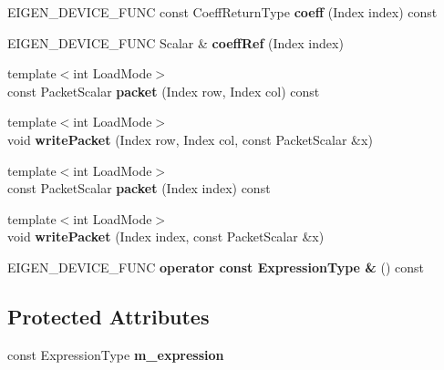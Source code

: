 \begin{DoxyCompactItemize}
E\+I\+G\+E\+N\+\_\+\+D\+E\+V\+I\+C\+E\+\_\+\+F\+U\+NC const Coeff\+Return\+Type {\bfseries coeff} (Index index) const
\item 
\mbox{\label{class_eigen_1_1_nest_by_value_a18a3445c5f65d1d786b7f034228c5281}} 
E\+I\+G\+E\+N\+\_\+\+D\+E\+V\+I\+C\+E\+\_\+\+F\+U\+NC Scalar \& {\bfseries coeff\+Ref} (Index index)
\item 
\mbox{\label{class_eigen_1_1_nest_by_value_a4471429c46ad8b6e606630e3369a8df1}} 
{\footnotesize template$<$int Load\+Mode$>$ }\\const Packet\+Scalar {\bfseries packet} (Index row, Index col) const
\item 
\mbox{\label{class_eigen_1_1_nest_by_value_abe03d889bd5bef238d965f08ecbe8662}} 
{\footnotesize template$<$int Load\+Mode$>$ }\\void {\bfseries write\+Packet} (Index row, Index col, const Packet\+Scalar \&x)
\item 
\mbox{\label{class_eigen_1_1_nest_by_value_a939564a3561ff07f9fd9ea882e244e23}} 
{\footnotesize template$<$int Load\+Mode$>$ }\\const Packet\+Scalar {\bfseries packet} (Index index) const
\item 
\mbox{\label{class_eigen_1_1_nest_by_value_a61afcf4b01414da4f319778c849c8288}} 
{\footnotesize template$<$int Load\+Mode$>$ }\\void {\bfseries write\+Packet} (Index index, const Packet\+Scalar \&x)
\item 
\mbox{\label{class_eigen_1_1_nest_by_value_aa0573f625c3e1a5307a7effd6e9b158c}} 
E\+I\+G\+E\+N\+\_\+\+D\+E\+V\+I\+C\+E\+\_\+\+F\+U\+NC {\bfseries operator const Expression\+Type \&} () const
\end{DoxyCompactItemize}
\subsection*{Protected Attributes}
\begin{DoxyCompactItemize}
\item 
\mbox{\label{class_eigen_1_1_nest_by_value_a87876bf6943bdab360aa9e31ce20950e}} 
const Expression\+Type {\bfseries m\+\_\+expression}
\end{DoxyCompactItemize}


